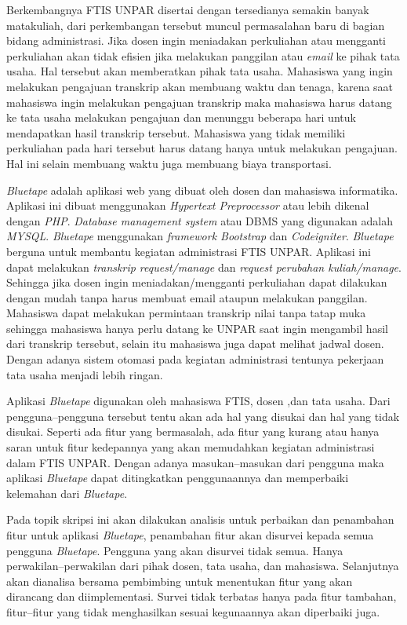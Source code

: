 \documentclass[a4paper,twoside]{article}
\begin{document}
 Berkembangnya FTIS UNPAR disertai dengan tersedianya semakin banyak matakuliah, dari perkembangan tersebut muncul permasalahan baru di bagian bidang administrasi. Jika dosen ingin meniadakan perkuliahan atau mengganti perkuliahan akan tidak efisien jika melakukan panggilan atau \textit{email} ke pihak tata usaha. Hal tersebut akan memberatkan pihak tata usaha. Mahasiswa yang ingin melakukan pengajuan transkrip akan membuang waktu dan tenaga, karena saat mahasiswa ingin melakukan pengajuan transkrip maka mahasiswa harus datang ke tata usaha melakukan pengajuan dan menunggu beberapa hari untuk mendapatkan hasil transkrip tersebut. Mahasiswa yang tidak memiliki perkuliahan pada hari tersebut harus datang hanya untuk melakukan pengajuan. Hal ini selain membuang waktu juga membuang biaya transportasi.


\textit{Bluetape} adalah aplikasi web yang dibuat oleh dosen dan mahasiswa informatika. Aplikasi ini dibuat menggunakan \textit{Hypertext Preprocessor} atau lebih dikenal dengan \textit{PHP}. \textit{Database management system} atau DBMS yang digunakan adalah \textit{MYSQL}.\textit{ Bluetape} menggunakan \textit{framework Bootstrap} dan \textit{Codeigniter}. \textit{Bluetape} berguna untuk membantu kegiatan administrasi FTIS UNPAR. Aplikasi ini dapat melakukan \textit{transkrip request/manage} dan \textit{request perubahan kuliah/manage}. Sehingga jika dosen ingin meniadakan/mengganti perkuliahan dapat dilakukan dengan mudah tanpa harus membuat email ataupun melakukan panggilan. Mahasiswa dapat melakukan permintaan transkrip nilai tanpa tatap muka sehingga mahasiswa hanya perlu datang ke UNPAR saat ingin mengambil hasil dari transkrip tersebut, selain itu mahasiswa juga dapat melihat jadwal dosen. Dengan adanya sistem otomasi pada kegiatan administrasi tentunya pekerjaan tata usaha menjadi lebih ringan. 


Aplikasi \textit{Bluetape} digunakan oleh mahasiswa FTIS, dosen ,dan tata usaha. Dari pengguna--pengguna tersebut tentu akan ada hal yang disukai dan hal yang tidak disukai. Seperti ada fitur yang bermasalah, ada fitur yang kurang atau hanya saran untuk fitur kedepannya yang akan memudahkan kegiatan administrasi dalam FTIS UNPAR. Dengan adanya masukan--masukan dari pengguna maka aplikasi \textit{Bluetape} dapat ditingkatkan penggunaannya dan memperbaiki kelemahan dari \textit{Bluetape}.

Pada topik skripsi ini akan dilakukan analisis untuk perbaikan dan penambahan fitur untuk aplikasi \textit{Bluetape}, penambahan fitur akan disurvei kepada semua pengguna \textit{Bluetape}. Pengguna yang akan disurvei tidak semua. Hanya perwakilan--perwakilan dari pihak dosen, tata usaha, dan mahasiswa. Selanjutnya akan dianalisa bersama pembimbing untuk menentukan fitur yang akan dirancang dan diimplementasi. Survei tidak terbatas hanya pada fitur tambahan, fitur--fitur yang tidak menghasilkan sesuai kegunaannya akan diperbaiki juga.
\end{document}
